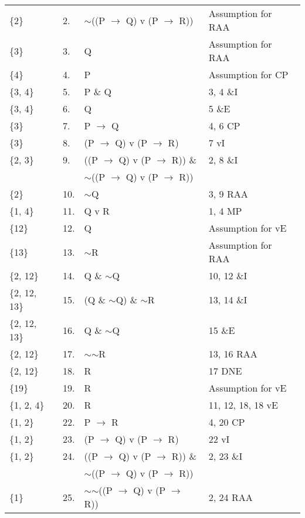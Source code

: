 \documentclass[a4paper,12pt]{article}
\newcommand{\mra}{$\rightarrow$ }
\newcommand{\ms}{$\sim$}
\begin{document}
\begin{enumerate}[label=\arabic*,leftmargin=*]
\begin{enumerate}[label=\arabic*.]
\begin{minipage}{\textwidth}
\begin{tabular}{l l l l}
                        \{2\} & 2. & \ms ((P \mra Q) v (P \mra R)) & Assumption for RAA\\
                        \{3\} & 3. & Q & Assumption for RAA\\
                        \{4\} & 4. & P &  Assumption for CP\\
                        \{3, 4\} & 5. & P \& Q & 3, 4 \&I\\
                        \{3, 4\} & 6. & Q & 5 \&E\\
                        \{3\} & 7. & P \mra Q & 4, 6 CP\\
                        \{3\} & 8. & (P \mra Q) v (P \mra R) & 7 vI\\
                        \{2, 3\} & 9. & ((P \mra Q) v (P \mra R)) \& & 2, 8 \&I\\
                         & & \ms ((P \mra Q) v (P \mra R)) & \\
                        \{2\} & 10. & \ms Q & 3, 9 RAA\\
                        \{1, 4\} & 11. & Q v R & 1, 4 MP\\
                        \{12\} & 12. & Q & Assumption for vE\\
                        \{13\} & 13. & \ms R & Assumption for RAA\\
                        \{2, 12\} & 14. & Q \& \ms Q & 10, 12 \&I\\
                        \{2, 12, 13\} & 15. & (Q \& \ms Q) \& \ms R & 13, 14 \&I\\
                        \{2, 12, 13\} & 16. & Q \& \ms Q & 15 \&E\\
                        \{2, 12\} & 17. & \ms \ms R & 13, 16 RAA\\
                        \{2, 12\} & 18. & R & 17 DNE\\
                        \{19\} & 19. & R & Assumption for vE\\
                        \{1, 2, 4\} & 20. & R & 11, 12, 18, 18 vE\\
                        \{1, 2\} & 22. & P \mra R & 4, 20 CP\\
                        \{1, 2\} & 23. & (P \mra Q) v (P \mra R) & 22 vI\\
                        \{1, 2\} & 24. & ((P \mra Q) v (P \mra R)) \& & 2, 23 \&I\\
                         & & \ms ((P \mra Q) v (P \mra R)) & \\
                        \{1\} & 25. & \ms \ms ((P \mra Q) v (P \mra R)) & 2, 24 RAA\\

\end{tabular}
\end{minipage}
\end{enumerate}
\end{enumerate}
\end{document}
